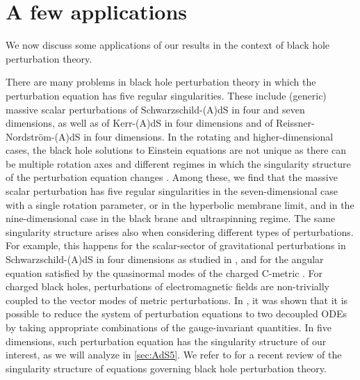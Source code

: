 \documentclass[11pt]{article}
\numberwithin{equation}{section}
\begin{document}
\section{A few applications}\label{sec:applications}
   We now discuss some applications of our results in the context of black hole perturbation theory.

There are many problems in black hole perturbation theory in which the perturbation equation has five regular singularities. 
These include (generic) massive scalar perturbations of Schwarzschild-(A)dS in four and seven dimensions, as well as of Kerr-(A)dS in four dimensions and of Reissner-Nordstr\"om-(A)dS in four dimensions. In the rotating and higher-dimensional cases, the black hole solutions to Einstein equations are not unique as there can be multiple rotation axes and different regimes in which the singularity structure of the perturbation equation changes \cite{Emparan:2003sy, Cardoso:2004cj, Emparan:2008eg, Caldarelli:2008pz, Hennigar:2015gan, Ponglertsakul:2020ufm}. Among these, we find that the massive scalar perturbation has five regular singularities in the seven-dimensional case with a single rotation parameter, or in the hyperbolic membrane limit, and in the nine-dimensional case in the black brane and ultraspinning regime. The same singularity structure arises also when considering different types of perturbations. For example, this happens for the scalar-sector of gravitational perturbations in Schwarzschild-(A)dS in four dimensions as studied in \cite{Aminov:2023jve}, and for the angular equation satisfied by the quasinormal modes of the charged C-metric \cite{Lei:2023mqx}.
For charged black holes, perturbations of electromagnetic fields are non-trivially coupled to the vector modes of metric perturbations. In \cite{Kodama:2003kk}, it was shown that it is possible to reduce the system of perturbation equations to two decoupled ODEs by taking appropriate combinations of the gauge-invariant quantities.
In five dimensions, such perturbation equation has the singularity structure of our interest, as we will analyze in \autoref{sec:AdS5}. We refer to \cite{Loganayagam:2022teq} for a recent review of the singularity structure of equations governing black hole perturbation theory.
\end{document}
